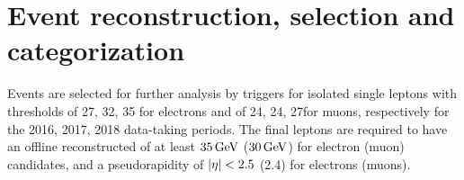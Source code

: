 

\section{Event reconstruction, selection and categorization}\label{sec:4}

Events are selected for further analysis by triggers for isolated single leptons with \pt thresholds of 27, 32, 35\GeV
for electrons and of 24, 24, 27\GeV for muons, respectively for the 2016, 2017, 2018 data-taking periods.  The final
leptons are required to have an offline reconstructed \pt of at least $35\,\text{Ge\hspace{-.08em}V}$ ($30\,\text{Ge\hspace{-.08em}V}$) for electron (muon)
candidates, and a pseudorapidity of $\lvert \eta \rvert<2.5$ (2.4) for electrons (muons).

